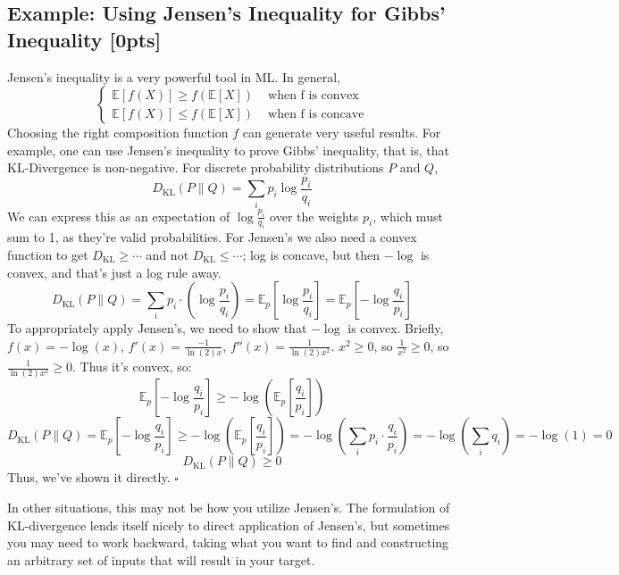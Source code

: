 \subsection*{Example: Using Jensen's Inequality for Gibbs' Inequality [0pts]}
Jensen's inequality is a very powerful tool in ML. In general,
$$\begin{cases}
    \mathbb{E}\left[f(X)\right] \geq f\left(\mathbb{E}[X]\right) & \text{ when f is convex} \\
    \mathbb{E}\left[f(X)\right] \leq f\left(\mathbb{E}[X]\right) & \text{ when f is concave}
\end{cases}$$
Choosing the right composition function $f$ can generate very useful results. For example, one can use Jensen's inequality to prove Gibbs' inequality, that is, that KL-Divergence is non-negative. For discrete probability distributions $P$ and $Q$,
$$ D_{\text{KL}}(P\|Q) = \sum_i p_i \log\frac{p_i}{q_i} $$
We can express this as an expectation of $\log\frac{p_i}{q_i}$ over the weights $p_i$, which must sum to 1, as they're valid probabilities. For Jensen's we also need a convex function to get $D_{\text{KL}}\geq\cdots$ and not $D_{\text{KL}}\leq\cdots$; log is concave, but then $-\log$ is convex, and that's just a log rule away.
$$ D_{\text{KL}}(P\|Q) = \sum_i p_i\cdot\left(\log\frac{p_i}{q_i}\right) = \mathbb{E}_p\left[\log\frac{p_i}{q_i}\right] = \mathbb{E}_p\left[-\log\frac{q_i}{p_i}\right] $$
To appropriately apply Jensen's, we need to show that $-\log$ is convex. Briefly, $f(x)=-\log(x)$, $f'(x)=\frac{-1}{\ln(2)x}$, $f''(x)=\frac{1}{\ln(2)x^2}$. $x^2\geq 0$, so $\frac{1}{x^2}\geq 0$, so $\frac{1}{\ln(2)x^2} \geq 0$. Thus it's convex, so:
$$ \mathbb{E}_p\left[-\log\frac{q_i}{p_i}\right] \geq -\log\left(\mathbb{E}_p\left[\frac{q_i}{p_i}\right]\right) $$
$$ D_{\text{KL}}(P\|Q) = \mathbb{E}_p\left[-\log\frac{q_i}{p_i}\right] \geq -\log\left(\mathbb{E}_p\left[\frac{q_i}{p_i}\right]\right) = -\log\left(\sum_i p_i\cdot \frac{q_i}{p_i}\right) = -\log\left(\sum_i q_i\right) = -\log\left(1\right) = 0 $$
$$ D_{\text{KL}}(P\|Q) \geq 0 $$
Thus, we've shown it directly. $\square$

\smallskip In other situations, this may not be how you utilize Jensen's. The formulation of KL-divergence lends itself nicely to direct application of Jensen's, but sometimes you may need to work backward, taking what you want to find and constructing an arbitrary set of inputs that will result in your target.


